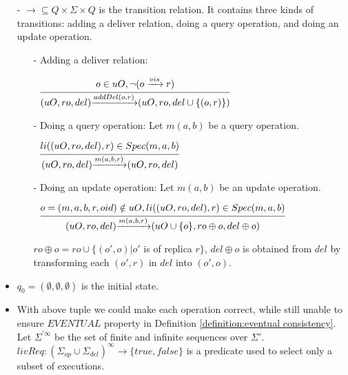 {\begin{itemize}
\item[-] $\rightarrow \subseteq Q \times \Sigma \times Q$ is the transition relation. It contains three kinds of transitions: adding a deliver relation, doing a query operation, and doing an update operation.

    \begin {itemize}
    \item[-] Adding a deliver relation:

     $\begin{array}{l c} \bigfrac{o \in uO, \neg(o \xrightarrow{vis} r)} {(uO,ro,del) {\xrightarrow{addDel(o,r)}} (uO,ro,del \cup \{ (o,r) \})} \end{array}$

    \item[-] Doing a query operation: Let $m(a,b)$ be a query operation.

     $\begin{array}{l c} \bigfrac{li((uO,ro,del),r) \in Spec(m,a,b)} {(uO,ro,del) {\xrightarrow{m(a,b,r)}} (uO,ro,del)}  \end{array}$

     \item[-] Doing an update operation: Let $m(a,b)$ be an update operation.

     $\begin{array}{l c} \bigfrac{o = (m,a,b,r,oid) \notin uO, li((uO,ro,del),r) \in Spec(m,a,b)} {(uO,ro,del) {\xrightarrow{m(a,b,r)}} (uO \cup \{ o \},ro \oplus o ,del \oplus o)}  \end{array}$

     $ro \oplus o = ro \cup \{ (o',o) \vert o'$ is of replica $r \}$, $del \oplus o$ is obtained from $del$ by transforming each $(o',r)$ in $del$ into $(o',o)$.
    \end{itemize}


\item[-] $q_0=(\emptyset,\emptyset,\emptyset)$ is the initial state.

\item[-] With above tuple we could make each operation correct, while still unable to ensure $\textit{EVENTUAL}$ property in Definition \ref{definition:eventual consistency}. Let $\Sigma^{'\infty}$ be the set of finite and infinite sequences over $\Sigma'$. $livReq: (\Sigma_{op} \cup \Sigma_{del})^{ \infty } \rightarrow \{ \textit{true},\textit{false} \}$ is a predicate used to select only a subset of executions.


\end{itemize}}
